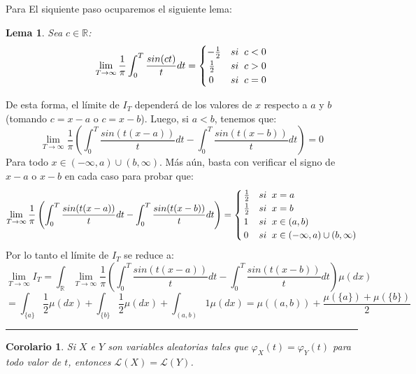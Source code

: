 \documentclass[a4paper]{article}
\newtheorem{lem}{Lema}
\newtheorem{cor}{Corolario}
\numberwithin{equation}{subsection}
\numberwithin{definicion}{subsection}
\def\R{\mathbb R}
\def\to{\rightarrow}
\begin{document}
Para El siquiente paso ocuparemos el siguiente lema:
\begin{lem} Sea $c\in\R$:
\[\lim_{T \to \infty}\frac{1}{\pi}\int_{0}^{T}\frac{sin(ct)}{t}dt = \begin{cases}
                -\frac{1}{2} & si\hspace{0.2cm}c<0\\
                \,\frac{1}{2} & si\hspace{0.2cm}c>0\\
                \,0 & si\hspace{0.2cm} c=0
                \end{cases}\]
\end{lem}
De esta forma, el límite de $I_T$ dependerá de los valores de $x$ respecto a $a$ y $b$ (tomando $c=x-a$ o $c=x-b$). Luego, si $a<b$, tenemos que:
\[\lim_{T\to \infty}\frac{1}{\pi}\left(\int_{0}^{T}\frac{sin(t(x-a))}{t}dt - \int_{0}^{T}\frac{sin(t(x-b))}{t}dt\right) = 0\]
Para todo $x \in (-\infty ,a)\cup (b,\infty)$. Más aún, basta con verificar el signo de $x-a$ o $x-b$ en cada caso para probar que:
\[\lim_{T\to \infty}\frac{1}{\pi}\left(\int_{0}^{T}\frac{sin(t(x-a))}{t}dt - \int_{0}^{T}\frac{sin(t(x-b))}{t}dt\right) = \begin{cases}
\,\frac{1}{2} & si\hspace{0.2cm}x=a\\
\,\frac{1}{2} & si\hspace{0.2cm}x=b\\
\,1 & si\hspace{0.2cm}x\in(a,b)\\
\,0 & si\hspace{0.2cm}x\in(-\infty,a)\cup(b,\infty)
\end{cases}\]
Por lo tanto el límite de $I_T$ se reduce a:
\[\lim_{T\to \infty}I_T = \int_{\R}\lim_{T\to \infty}\frac{1}{\pi}\left(\int_{0}^{T}\frac{sin(t(x-a))}{t}dt - \int_{0}^{T}\frac{sin(t(x-b))}{t}dt\right)\mu(dx)\]
\[= \int_{\{a\}}\frac{1}{2}\mu(dx) + \int_{\{b\}}\frac{1}{2}\mu(dx) + \int_{(a,b)}1\mu(dx) = \mu((a,b)) + \frac{\mu(\{a\})+\mu(\{b\})}{2}\]
\rule{0.7em}{0.7em}

\begin{cor}
Si $X$ e $Y$ son variables aleatorias tales que $\varphi_X(t) = \varphi_Y(t)$ para todo valor de $t$, entonces $\mathcal{L}(X)=\mathcal{L}(Y)$.
\end{cor}
\end{document}
